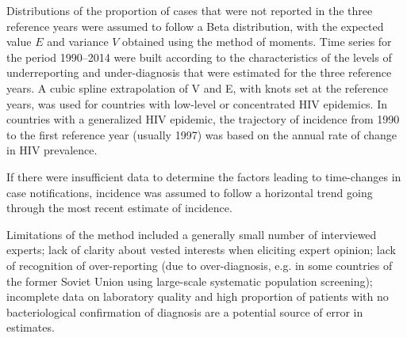 Distributions of the proportion of cases that were not reported in the three reference years were assumed to follow a Beta distribution, with the expected value $E$ and variance $V$ obtained using the method of moments\cite{Renyi2007}. Time series for the period 1990–2014 were built according to the characteristics of the levels of underreporting and under-diagnosis that were estimated for the three reference years. A cubic spline extrapolation of V and E, with knots set at the reference years, was used for countries with low-level or concentrated HIV epidemics. In countries with a generalized HIV epidemic, the trajectory of incidence from 1990 to the first reference year (usually 1997) was based on the annual rate of change in HIV prevalence. 

If there were insufficient data to determine the factors leading to time-changes in case notifications, incidence was assumed to follow a horizontal trend going through the most recent estimate of incidence. 

Limitations of the method included a generally small number of interviewed experts; lack of clarity about vested interests when eliciting expert opinion; lack of recognition of over-reporting (due to over-diagnosis,  e.g. in some countries of the former Soviet Union using large-scale systematic population screening); 
incomplete data on laboratory quality and high proportion of patients with no bacteriological confirmation of diagnosis are a potential source of error in estimates.



